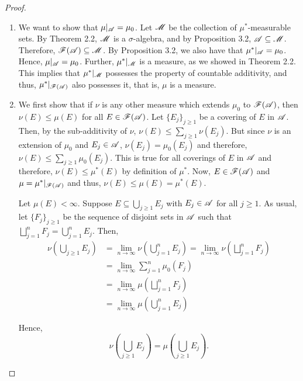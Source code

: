     \begin{proof}
        \begin{enumerate}
            \item We want to show that $\mu|_{\mathscr{A}} = \mu_0$. Let $\mathscr{M}$ be the collection of $\mu^*$-measurable sets. By Theorem 2.2, $\mathscr{M}$ is a $\sigma$-algebra, and by Proposition 3.2, $\mathscr{A} \subseteq \mathscr{M}$. Therefore, $\mathscr{F}(\mathscr{A}) \subseteq \mathscr{M}$. By Proposition 3.2, we also have that $\mu^*|_{\mathscr{A}} = \mu_0$. Hence, $\mu|_{\mathscr{A}} = \mu_0$. Further, $\mu^*|_{\mathscr{M}}$ is a measure, as we showed in Theorem 2.2. This implies that $\mu^*|_{\mathscr{M}}$ possesses the property of countable additivity, and thus, $\mu^*|_{\mathscr{F}(\mathscr{A})}$ also possesses it, that is, $\mu$ is a measure. 

            \item We first show that if $\nu$ is any other measure which extends $\mu_0$ to $\mathscr{F}(\mathscr{A})$, then $\nu(E) \leq \mu(E)$ for all $E \in \mathscr{F}(\mathscr{A})$. Let $\{E_j\}_{j \geq 1}$ be a covering of $E$ in $\mathscr{A}$. Then, by the sub-additivity of $\nu$, $\nu(E) \leq \sum_{j \geq 1} \nu(E_j)$. But since $\nu$ is an extension of $\mu_0$ and $E_j \in \mathscr{A}$, $\nu(E_j) = \mu_0(E_j)$ and therefore, $\nu(E) \leq \sum_{j \geq 1} \mu_0(E_j)$. This is true for all coverings of $E$ in $\mathscr{A}$ and therefore, $\nu(E) \leq \mu^*(E)$ by definition of $\mu^*$. Now, $E \in \mathscr{F}(\mathscr{A})$ and $\mu = \mu^*|_{\mathscr{F}(\mathscr{A})}$ and thus, $\nu(E) \leq \mu(E) = \mu^*(E)$. 

            Let $\mu(E) < \infty$. Suppose $E \subseteq \bigcup_{j \geq 1} E_j$ with $E_j \in \mathscr{A}$ for all $j \geq 1$. As usual, let $\{F_j\}_{j \geq 1}$ be the sequence of disjoint sets in $\mathscr{A}$ such that $\bigsqcup_{j = 1}^n F_j = \bigcup_{j = 1}^n E_j$. Then, 
            \begin{align*}
                \nu\left( \bigcup_{j \geq 1} E_j \right) &= \lim_{n \to \infty} \nu \left( \bigcup_{j = 1}^n E_j\right) = \lim_{n \to \infty} \nu \left( \bigsqcup_{j = 1}^n F_j\right) \\
                &= \lim_{n \to \infty} \sum_{j = 1}^{n} \mu_0(F_j) \\
                &= \lim_{n \to \infty} \mu \left( \bigsqcup_{j = 1}^n F_j\right) \tag{as $\mu$ is also an extension of $\mu_0$} \\
                &= \lim_{n \to \infty} \mu \left( \bigcup_{j = 1}^n E_j\right)
            \end{align*}

            Hence, 
            \begin{equation}
                \nu\left( \bigcup_{j \geq 1} E_j \right) = \mu\left( \bigcup_{j \geq 1} E_j \right).
            \end{equation}            
            

\end{enumerate}
\end{proof}
